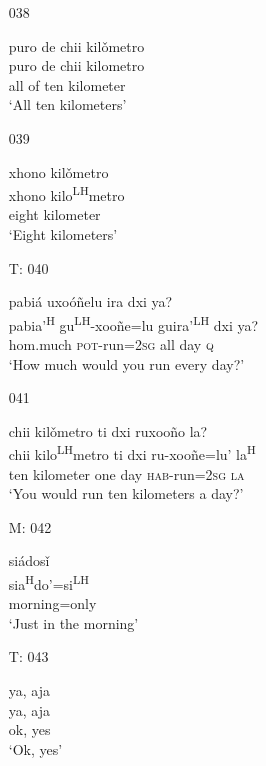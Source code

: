 \begin{itemize}
\item[038]
 
\glll   puro de chii kil\v{o}metro\\
puro de chii kilometro\\
all of ten kilometer\\
\glt `All ten kilometers'\\
 


\item[039]
 
\glll    xhono kil\v{o}metro\\
 xhono kilo\textsuperscript{LH}metro\\
eight kilometer\\
\glt `Eight kilometers'
 

 
 
\item[T: 040]
 
\glll   pabi\'{a} uxo\'{o}\~{n}elu ira dxi ya?\\
pabia'\textsuperscript{H} gu\textsuperscript{LH}-xoo\~{n}e=lu guira'\textsuperscript{LH} dxi ya?\\
hom.much \textsc{pot}-run=\textsc{2sg} all day \textsc{q}\\
\glt `How much would you run every day?'
 

\item[041]
 
\glll   chii kil\v{o}metro ti dxi ruxoo\~{n}o la?\\
 chii kilo\textsuperscript{LH}metro ti dxi ru-xoo\~{n}e=lu' la\textsuperscript{H}\\
 ten kilometer one day \textsc{hab}-run=\textsc{2sg} \textsc{la}\\
\glt `You would run ten kilometers a day?' 
 

\item[M: 042]
 
\glll   si\'{a}dos\v{i}\\
sia\textsuperscript{H}do'=si\textsuperscript{LH}\\
morning=only\\
\glt `Just in the morning'
 

\item[T: 043]
 
\glll   ya, aja\\
ya, aja\\
ok, yes\\
\glt `Ok, yes'
 



\end{itemize}
